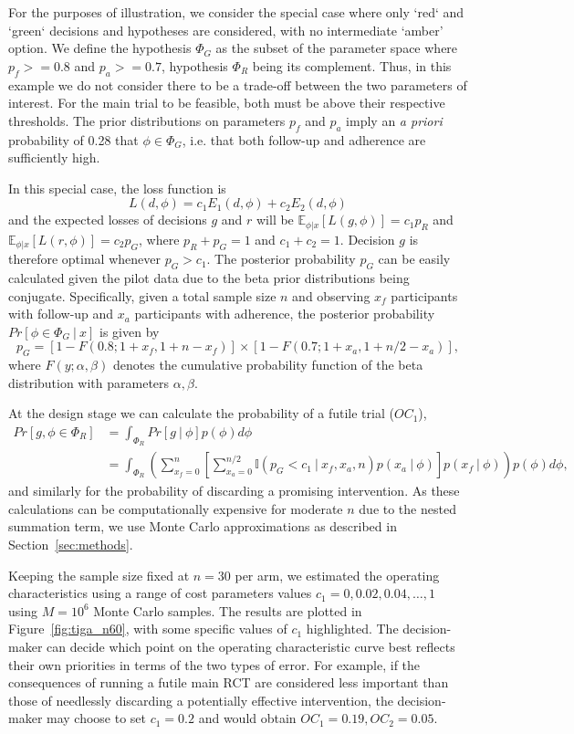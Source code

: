 \documentclass[AMA,STIX1COL]{WileyNJD-v2}
\begin{document}
For the purposes of illustration, we consider the special case where only `red` and `green` decisions and hypotheses are considered, with no intermediate `amber' option. We define the hypothesis $\Phi_G$ as the subset of the parameter space where $p_f >= 0.8$ and $p_a >= 0.7$, hypothesis $\Phi_R$ being its complement. Thus, in this example we do not consider there to be a trade-off between the two parameters of interest. For the main trial to be feasible, both must be above their respective thresholds. The prior distributions on parameters $p_f$ and $p_a$ imply an \emph{a priori} probability of 0.28 that $\phi \in \Phi_G$, i.e. that both follow-up and adherence are sufficiently high.

In this special case, the loss function is 
$$
L(d, \phi) = c_1 E_1(d, \phi) + c_2 E_2(d, \phi)
$$
and the expected losses of decisions $g$ and $r$ will be $\mathbb{E}_{\phi | x}[L(g, \phi)] = c_1 p_R$ and $\mathbb{E}_{\phi | x}[L(r, \phi)] = c_2 p_G $, where $p_R + p_G = 1$ and $c_1 + c_2 = 1$. Decision $g$ is therefore optimal whenever $p_G > c_1$. The posterior probability $p_G$ can be easily calculated given the pilot data due to the beta prior distributions being conjugate. Specifically, given a total sample size $n$ and observing $x_f$ participants with follow-up and $x_a$ participants with adherence, the posterior probability $Pr[\phi \in \Phi_G ~|~ x]$ is given by
\begin{equation}
p_G = [1 - F(0.8; 1+x_f, 1+n-x_f)] \times [1 - F(0.7; 1+x_a, 1 + n/2 - x_a)],
\end{equation}
where $F(y; \alpha, \beta)$ denotes the cumulative probability function of the beta distribution with parameters $\alpha, \beta$.

At the design stage we can calculate the probability of a futile trial ($OC_1$),
\begin{align}
Pr[g, \phi \in \Phi_R] &= \int_{\Phi_R} Pr[g ~|~ \phi] p(\phi) d\phi \\
 &= \int_{\Phi_R} \left( \sum_{x_f = 0}^{n} \left[ \sum_{x_a = 0}^{n/2}  \mathbb{I}(p_G < c_1 ~|~ x_f, x_a, n) p(x_a ~|~ \phi) \right]p(x_f ~|~ \phi) \right)p(\phi) d\phi,
\end{align}
and similarly for the probability of discarding a promising intervention. As these calculations can be computationally expensive for moderate $n$ due to the nested summation term, we use Monte Carlo approximations as described in Section~\ref{sec:methods}. 

Keeping the sample size fixed at $n = 30$ per arm, we estimated the operating characteristics using a range of cost parameters values $c_1 = 0, 0.02, 0.04, \ldots , 1$ using $M = 10^6$ Monte Carlo samples. The results are plotted in Figure~\ref{fig:tiga_n60}, with some specific values of $c_1$ highlighted. The decision-maker can decide which point on the operating characteristic curve best reflects their own priorities in terms of the two types of error. For example, if the consequences of running a futile main RCT are considered less important than those of needlessly discarding a potentially effective intervention, the decision-maker may choose to set $c_1 = 0.2$ and would obtain $OC_1 = 0.19, OC_2 = 0.05$.
\end{document}
